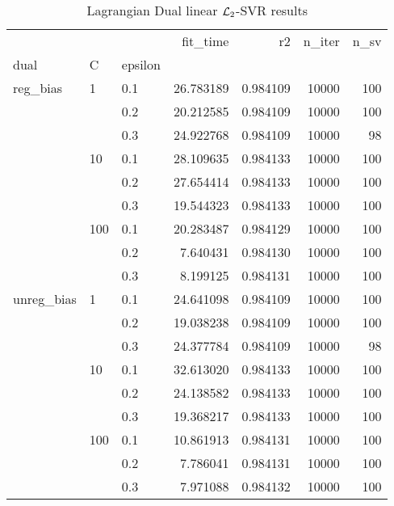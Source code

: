 \begin{table}[H]
\centering
\caption{Lagrangian Dual linear $\protect \mathcal{L}_2$-SVR results}
\label{linear_lagrangian_dual_l2_svr_cv_results}
\begin{tabular}{lllrrrr}
\toprule
           &     &     &   fit\_time &        r2 &  n\_iter &  n\_sv \\
dual & C & epsilon &            &           &         &       \\
\midrule
reg\_bias & 1   & 0.1 &  26.783189 &  0.984109 &   10000 &   100 \\
           &     & 0.2 &  20.212585 &  0.984109 &   10000 &   100 \\
           &     & 0.3 &  24.922768 &  0.984109 &   10000 &    98 \\
           & 10  & 0.1 &  28.109635 &  0.984133 &   10000 &   100 \\
           &     & 0.2 &  27.654414 &  0.984133 &   10000 &   100 \\
           &     & 0.3 &  19.544323 &  0.984133 &   10000 &   100 \\
           & 100 & 0.1 &  20.283487 &  0.984129 &   10000 &   100 \\
           &     & 0.2 &   7.640431 &  0.984130 &   10000 &   100 \\
           &     & 0.3 &   8.199125 &  0.984131 &   10000 &   100 \\
unreg\_bias & 1   & 0.1 &  24.641098 &  0.984109 &   10000 &   100 \\
           &     & 0.2 &  19.038238 &  0.984109 &   10000 &   100 \\
           &     & 0.3 &  24.377784 &  0.984109 &   10000 &    98 \\
           & 10  & 0.1 &  32.613020 &  0.984133 &   10000 &   100 \\
           &     & 0.2 &  24.138582 &  0.984133 &   10000 &   100 \\
           &     & 0.3 &  19.368217 &  0.984133 &   10000 &   100 \\
           & 100 & 0.1 &  10.861913 &  0.984131 &   10000 &   100 \\
           &     & 0.2 &   7.786041 &  0.984131 &   10000 &   100 \\
           &     & 0.3 &   7.971088 &  0.984132 &   10000 &   100 \\
\bottomrule
\end{tabular}
\end{table}
